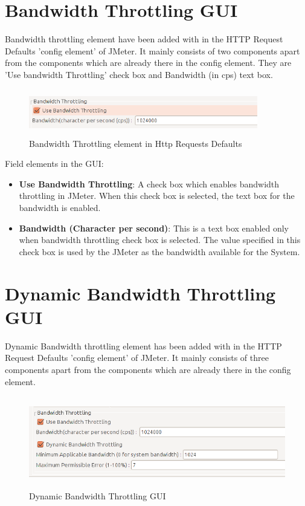 \documentclass[12pt]{book}
\begin{document}
  \section{Bandwidth Throttling GUI}
  Bandwidth throttling element have been added with in the HTTP Request Defaults 'config
element' of JMeter. It mainly consists of two components apart from the components which are
already there in the config element. They are 'Use bandwidth Throttling' check box and
Bandwidth (in cps) text box.

  \begin{figure}[H]
   \centering
   \includegraphics[width=10cm, height=2cm]{images/bandwidth_1}
   \caption{Bandwidth Throttling element in Http Requests Defaults\label{fig:fig19_JMeter}}
  \end{figure}
  
Field elements in the GUI:
 \begin{itemize}
  \item \textbf{Use Bandwidth Throttling}: A check box which enables bandwidth throttling in JMeter. When this check box is selected,
  the text box for the bandwidth is enabled.
  \item \textbf{Bandwidth (Character per second)}: This is a text box enabled only when bandwidth throttling check box is selected. 
  The value specified in this check box is used by the JMeter as the bandwidth available for the System.
 \end{itemize}
 
\section{Dynamic Bandwidth Throttling GUI}
Dynamic Bandwidth throttling element has been added with in the HTTP Request Defaults
'config element' of JMeter. It mainly consists of three components apart from the components
which are already there in the config element.

  \begin{figure}[H]
   \centering
   \includegraphics[width=14cm, height=4cm]{images/dbandwidth_1}
   \caption{Dynamic Bandwidth Throttling GUI\label{fig:fig20_JMeter}}
  \end{figure}
  
\end{document}
